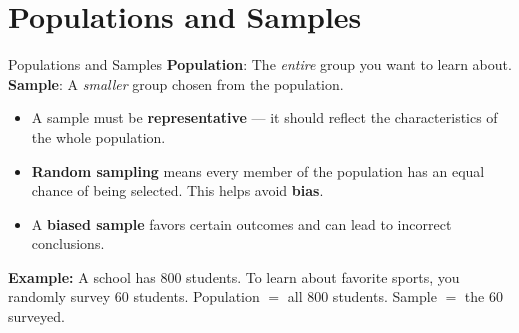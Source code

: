 \section{Populations and Samples}

\begin{quickReview}{Populations and Samples}
\textbf{Population}: The \emph{entire} group you want to learn about.
\textbf{Sample}: A \emph{smaller} group chosen from the population.

\begin{itemize}[leftmargin=*]
    \item A sample must be \textbf{representative} — it should reflect the characteristics of the whole population.
    \item \textbf{Random sampling} means every member of the population has an equal chance of being selected. This helps avoid \textbf{bias}.
    \item A \textbf{biased sample} favors certain outcomes and can lead to incorrect conclusions.
\end{itemize}

\medskip
\textbf{Example:} A school has $800$ students. To learn about favorite sports, you randomly survey $60$ students.
Population $=$ all $800$ students. Sample $=$ the $60$ surveyed.
\end{quickReview}


